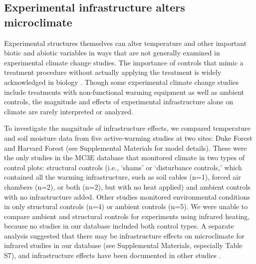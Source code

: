 \documentclass{article}
\begin{document}
\subsection* {Experimental infrastructure alters microclimate}
Experimental structures themselves can alter temperature and other important biotic and abiotic variables in ways that are not generally examined in experimental climate change studies. The importance of controls that mimic a treatment procedure without actually applying the treatment is widely acknowledged in biology \citep[e.g.,][]{dayton1971,spector2001,johnson2002,quinn2002}. Though some experimental climate change studies include treatments with non-functional warming equipment as well as ambient controls, the magnitude and effects of experimental infrastructure alone on climate are rarely interpreted or analyzed.
\par To investigate the magnitude of infrastructure effects, we compared temperature and soil moisture data from five active-warming studies at two sites: Duke Forest and Harvard Forest \citep{farnsworth1995,clark2014b, marchin2015, pelini2011}(see Supplemental Materials for model details). These were the only studies in the MC3E database that monitored climate in two types of control plots: structural controls (i.e., `shams' or `disturbance controls,' which contained all the warming infrastructure, such as soil cables (n=1), forced air chambers (n=2), or both (n=2), but with no heat applied) and ambient controls with no infrastructure added. Other studies monitored environmental conditions in only structural controls (n=4) or ambient controls (n=5). We were unable to compare ambient and structural controls for experiments using infrared heating, because no studies in our database included both control types. A separate analysis suggested that there may be infrastructure effects on microclimate for infrared studies in our database (see Supplemental Materials, especially Table S7), and infrastructure effects have been documented in other studies \citep[e.g., shading][]{kimball2008}. 
\end{document}
